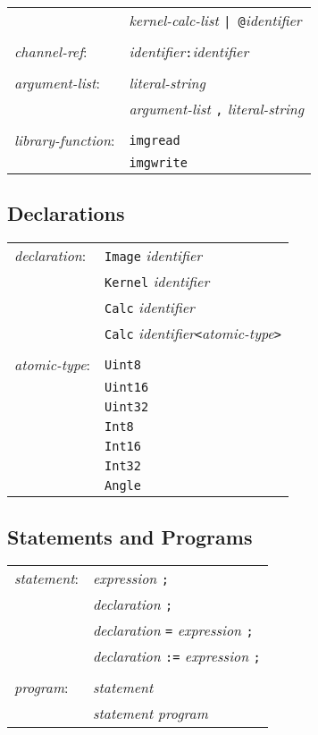 \begin{center}
\begin{tabular}{l l}
& \emph{kernel-calc-list} \texttt{| @}\emph{identifier}\\
\\
\emph{channel-ref}: & \emph{identifier}\texttt{:}\emph{identifier}\\
\\
\emph{argument-list}: & \emph{literal-string}\\
& \emph{argument-list} \texttt{,} \emph{literal-string}\\
\\
\emph{library-function}: & \texttt{imgread}\\
& \texttt{imgwrite}\\
\end{tabular}\end{center}

\subsection{Declarations}

\begin{center}\begin{tabular}{l l}
\emph{declaration}: & \texttt{Image} \emph{identifier}\\
& \texttt{Kernel} \emph{identifier}\\
& \texttt{Calc} \emph{identifier}\\
& \texttt{Calc} \emph{identifier}\texttt{<}\emph{atomic-type}\texttt{>}\\
\\
\emph{atomic-type}: & \texttt{Uint8}\\
& \texttt{Uint16}\\
& \texttt{Uint32}\\
& \texttt{Int8}\\
& \texttt{Int16}\\
& \texttt{Int32}\\
& \texttt{Angle}\\
\end{tabular}\end{center}


\subsection{Statements and Programs}

\begin{center}\begin{tabular}{l l}
\emph{statement}: & \emph{expression} \texttt{;}\\
& \emph{declaration} \texttt{;}\\
& \emph{declaration} \texttt{=} \emph{expression} \texttt{;}\\
& \emph{declaration} \texttt{:=} \emph{expression} \texttt{;}\\
\\
\emph{program}: & \emph{statement}\\
& \emph{statement} \emph{program}\\
\end{tabular}\end{center}


